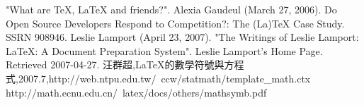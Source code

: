 "What are TeX, LaTeX and friends?".
Alexia Gaudeul (March 27, 2006). Do Open Source Developers Respond to Competition?: The (La)TeX Case Study. SSRN 908946.
Leslie Lamport (April 23, 2007). "The Writings of Leslie Lamport: LaTeX: A Document Preparation System". Leslie Lamport's Home Page. Retrieved 2007-04-27.
汪群超,\LaTeX 的數學符號與方程式,2007.7,http://web.ntpu.edu.tw/~ccw/statmath/template\_math.ctx
http://math.ecnu.edu.cn/~latex/docs/others/mathsymb.pdf